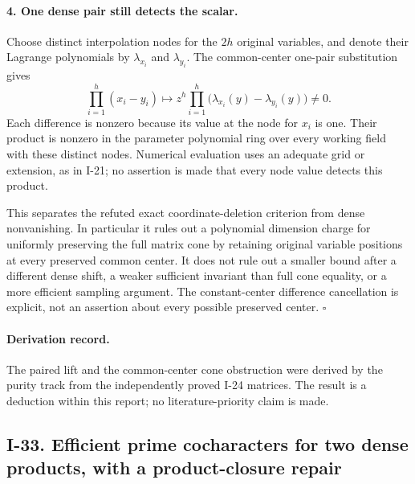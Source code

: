 \paragraph{4. One dense pair still detects the scalar.}
Choose distinct interpolation nodes for the $2h$ original
variables, and denote their Lagrange polynomials by
$\lambda_{x_i}$ and $\lambda_{y_i}$. The common-center
one-pair substitution gives
\[
 \prod_{i=1}^h(x_i-y_i)
   \longmapsto
 z^h\prod_{i=1}^h
       \bigl(\lambda_{x_i}(y)-\lambda_{y_i}(y)\bigr)\ne0.
 \tag{I.61}
\]
Each difference is nonzero because its value at the node
for $x_i$ is one. Their product is nonzero in the parameter
polynomial ring over every working field with these distinct
nodes. Numerical evaluation uses an adequate grid or extension,
as in I-21; no assertion is made that every node value detects
this product.

This separates the refuted exact coordinate-deletion criterion
from dense nonvanishing. In particular it rules out a polynomial
dimension charge for uniformly preserving the full matrix cone
by retaining original variable positions at every preserved
common center. It does not rule out a smaller bound after a
different dense shift, a weaker sufficient invariant than full
cone equality, or a more efficient sampling argument. The
constant-center difference cancellation is explicit, not an
assertion about every possible preserved center. $\square$

\paragraph{Derivation record.}
The paired lift and the common-center cone obstruction were
derived by the purity track from the independently proved
I-24 matrices. The result is a deduction within this report;
no literature-priority claim is made.


\subsection{I-33. Efficient prime cocharacters for two dense products, with a product-closure repair}
\label{I-33}

